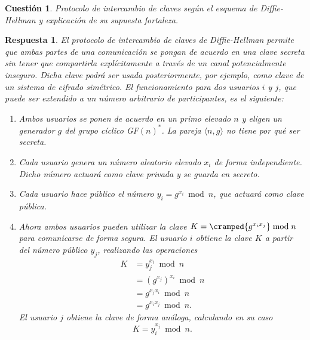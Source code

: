 \documentclass[
  a4paper,
  spanish,
  12pt,
]{scrartcl}
\theoremstyle{ejercicio-style}
\newtheorem{ejer}{Cuestión}
\theoremstyle{remark-style}
\newtheorem*{sol}{Respuesta}
\theoremstyle{teorema-style}
\begin{document}
\begin{ejer}
  Protocolo de intercambio de claves según el esquema de Diffie-Hellman y explicación de su supuesta fortaleza.
  \label{q:6}
\end{ejer}

\begin{sol}
  El protocolo de intercambio de claves de Diffie-Hellman permite que ambas partes de una comunicación se pongan de acuerdo en una clave secreta sin tener que compartirla explícitamente a través de un canal potencialmente inseguro. Dicha clave podrá ser usada posteriormente, por ejemplo, como clave de un sistema de cifrado simétrico.
  El funcionamiento para dos usuarios $i$ y $j$, que puede ser extendido a un número arbitrario de participantes, es el siguiente:
  \begin{enumerate}
    \item Ambos usuarios se ponen de acuerdo en un primo elevado $n$ y eligen un generador $g$ del grupo cíclico GF$(n)^\ast$. La pareja $\langle n, g \rangle$ no tiene por qué ser secreta.
    \item Cada usuario genera un número aleatorio elevado \(x_i\) de forma independiente. Dicho número actuará como \textit{clave privada} y se guarda en secreto.
    \item Cada usuario hace público el número $y_i = g^{x_i} \bmod n$, que actuará como \textit{clave pública}.
    \item Ahora ambos usuarios pueden utilizar la clave \(K = \cramped{g^{x_ix_j}} \bmod n\) para comunicarse de forma segura.
    El usuario \(i\) obtiene la clave \(K\) a partir del número público \(y_j\), realizando las operaciones \begin{align*}
      K &= y_j^{x_i} \bmod n \\
        &= (g^{x_j})^{x_i} \bmod n \\
        &= g^{x_jx_i} \bmod n \\
        &= g^{x_ix_j} \bmod n.
    \end{align*}
    El usuario \(j\) obtiene la clave de forma análoga, calculando en su caso \[K = y_i^{x_j} \bmod n.\]
  \end{enumerate}


\end{sol}
\end{document}
